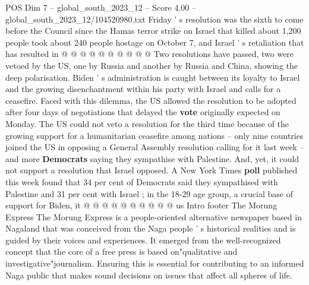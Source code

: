 \begin{textsample}{POS Dim 7 – global\_south\_2023\_12 – Score 4.00 – global\_south\_2023\_12/104520980.txt}
Friday ' s resolution was the sixth to come before the Council since the Hamas terror strike on Israel that killed about 1,200 people took about 240 people hostage on October 7, and Israel ' s retaliation that has resulted in @ @ @ @ @ @ @ @ @ @ Two resolutions have passed, two were vetoed by the US, one by Russia and another by Russia and China, showing the deep polarisation.
Biden ' s administration is caught between its loyalty to Israel and the growing disenchantment within his party with Israel and calls for a ceasefire.
Faced with this dilemma, the US allowed the resolution to be adopted after four days of negotiations that delayed the \textbf{vote} originally expected on Monday.
The US could not veto a resolution for the third time because of the growing support for a humanitarian ceasefire among nations -- only nine countries joined the US in opposing a General Assembly resolution calling for it last week -- and more \textbf{Democrats} saying they sympathise with Palestine.
And, yet, it could not support a resolution that Israel opposed.
A New York Times \textbf{poll} published this week found that 34 per cent of Democrats said they sympathised with Palestine and 31 per cent with Israel ; in the 18-29 age group, a crucial base of support for Biden, it @ @ @ @ @ @ @ @ @ @ us Intro footer The Morung Express The Morung Express is a people-oriented alternative newspaper based in Nagaland that was conceived from the Naga people ' s historical realities and is guided by their voices and experiences.
It emerged from the well-recognized concept that the core of a free press is based on"qualitative and investigative"journalism.
Ensuring this is essential for contributing to an informed Naga public that makes sound decisions on issues that affect all spheres of life.

\end{textsample}
